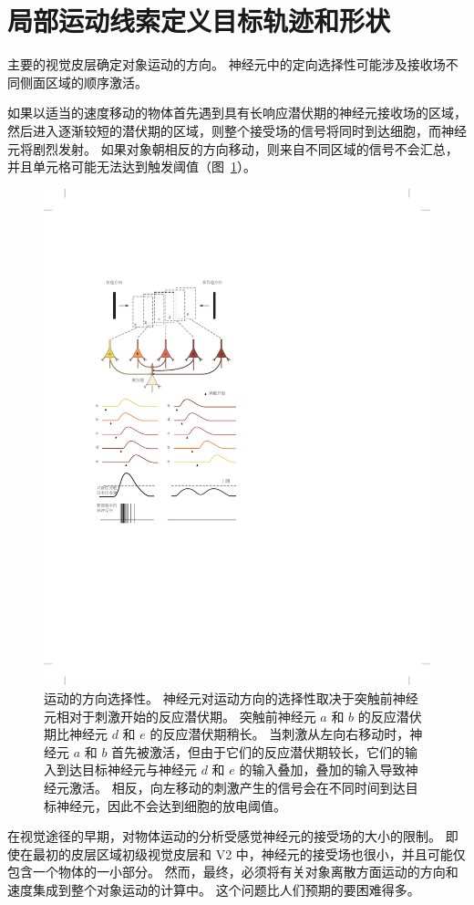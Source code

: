 \section{局部运动线索定义目标轨迹和形状}

主要的视觉皮层确定对象运动的方向。
神经元中的定向选择性可能涉及接收场不同侧面区域的顺序激活。


如果以适当的速度移动的物体首先遇到具有长响应潜伏期的神经元接收场的区域，然后进入逐渐较短的潜伏期的区域，则整个接受场的信号将同时到达细胞，而神经元将剧烈发射。
如果对象朝相反的方向移动，则来自不同区域的信号不会汇总，并且单元格可能无法达到触发阈值（图~\ref{fig:23_10}）。


\begin{figure}[htbp]
	\centering
	\includegraphics[width=0.7\linewidth]{chap23/fig_23_10}
	\caption{运动的方向选择性。
		神经元对运动方向的选择性取决于突触前神经元相对于刺激开始的反应潜伏期。
		突触前神经元 $a$ 和 $b$ 的反应潜伏期比神经元 $d$ 和 $e$ 的反应潜伏期稍长。
		当刺激从左向右移动时，神经元 $a$ 和 $b$ 首先被激活，但由于它们的反应潜伏期较长，它们的输入到达目标神经元与神经元 $d$ 和 $e$ 的输入叠加，叠加的输入导致神经元激活。
		相反，向左移动的刺激产生的信号会在不同时间到达目标神经元，因此不会达到细胞的放电阈值\cite{priebe2008inhibition}。}
	\label{fig:23_10}
\end{figure}


在视觉途径的早期，对物体运动的分析受感觉神经元的接受场的大小的限制。 
即使在最初的皮层区域初级视觉皮层和 V2 中，神经元的接受场也很小，并且可能仅包含一个物体的一小部分。 
然而，最终，必须将有关对象离散方面运动的方向和速度集成到整个对象运动的计算中。 
这个问题比人们预期的要困难得多。


